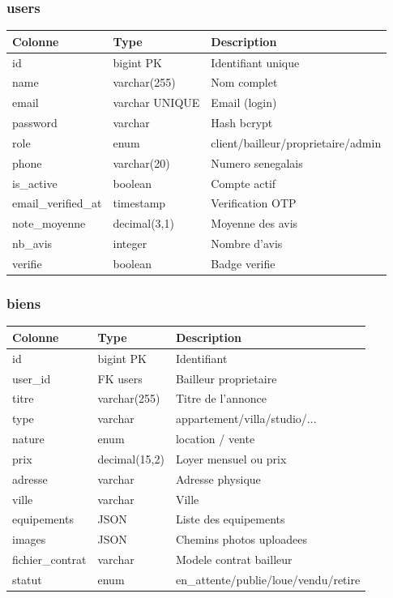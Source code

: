 \documentclass[12pt,a4paper]{article}
\begin{document}
\subsubsection{users}
\begin{center}
\begin{tabular}{|p{3.5cm}|p{3cm}|p{6cm}|}
\hline
\textbf{Colonne} & \textbf{Type} & \textbf{Description} \\
\hline
id & bigint PK & Identifiant unique \\
name & varchar(255) & Nom complet \\
email & varchar UNIQUE & Email (login) \\
password & varchar & Hash bcrypt \\
role & enum & client/bailleur/proprietaire/admin \\
phone & varchar(20) & Numero senegalais \\
is\_active & boolean & Compte actif \\
email\_verified\_at & timestamp & Verification OTP \\
note\_moyenne & decimal(3,1) & Moyenne des avis \\
nb\_avis & integer & Nombre d'avis \\
verifie & boolean & Badge verifie \\
\hline
\end{tabular}
\end{center}

\subsubsection{biens}
\begin{center}
\begin{tabular}{|p{3.5cm}|p{3cm}|p{6cm}|}
\hline
\textbf{Colonne} & \textbf{Type} & \textbf{Description} \\
\hline
id & bigint PK & Identifiant \\
user\_id & FK users & Bailleur proprietaire \\
titre & varchar(255) & Titre de l'annonce \\
type & varchar & appartement/villa/studio/... \\
nature & enum & location / vente \\
prix & decimal(15,2) & Loyer mensuel ou prix \\
adresse & varchar & Adresse physique \\
ville & varchar & Ville \\
equipements & JSON & Liste des equipements \\
images & JSON & Chemins photos uploadees \\
fichier\_contrat & varchar & Modele contrat bailleur \\
statut & enum & en\_attente/publie/loue/vendu/retire \\
\hline
\end{tabular}
\end{center}
\end{document}
